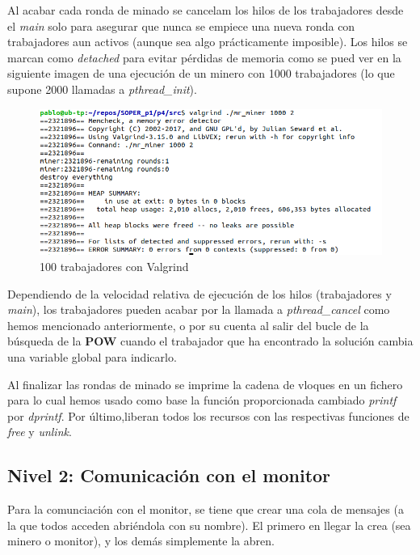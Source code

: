 \documentclass{article}
\begin{document}
    Al acabar cada ronda de minado se cancelam los hilos de los trabajadores desde el \textit{main} solo para asegurar que nunca se empiece una nueva ronda con trabajadores aun activos (aunque sea algo prácticamente imposible). Los hilos se marcan como \textit{detached} para evitar pérdidas de memoria como se pued ver en la siguiente imagen de una ejecución de un minero con 1000 trabajadores (lo que supone 2000 llamadas a \textit{pthread\_init}). 

    \begin{figure}[h!]
        \centering
        \includegraphics[scale=.41]{./pruebas/valgrind_1000_trabajadores}
        \caption{100 trabajadores con Valgrind}
    \end{figure}

    
    Dependiendo de la velocidad relativa de ejecución de los hilos (trabajadores y \textit{main}), los trabajadores pueden acabar por la llamada a \textit{pthread\_cancel} como hemos mencionado anteriormente, o por su cuenta al salir del bucle de la búsqueda de la \textbf{POW} cuando el trabajador que ha encontrado la solución cambia una variable global para indicarlo.

    
    Al finalizar las rondas de minado se imprime la cadena de vloques en un fichero para lo cual hemos usado como base la función proporcionada cambiado \textit{printf} por \textit{dprintf}. Por último,liberan todos los recursos con las respectivas funciones de \textit{free} y \textit{unlink}.

    

\subsection*{Nivel 2: Comunicación con el monitor}

    Para la comunciación con el monitor, se tiene que crear una cola de mensajes (a la que todos acceden abriéndola con su nombre). El primero en llegar la crea (sea minero o monitor), y los demás simplemente la abren.
    
\end{document}
